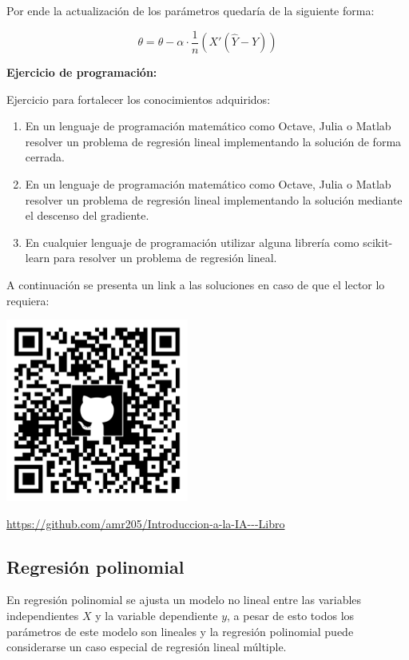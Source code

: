 \documentclass[11pt,fleqn]{book} %
\begin{document}
Por ende la actualización de los parámetros quedaría de la siguiente forma:

\begin{equation}
\label{eqn:linear_regression_gradient_descent}
\theta = \theta - \alpha \cdot \frac{1}{n} \left ( X' (\hat{Y}-Y ) \right )
\end{equation}

\textbf{Ejercicio de programación:}

Ejercicio para fortalecer los conocimientos adquiridos:

\begin{enumerate}
\item En un lenguaje de programación matemático como Octave, Julia o Matlab resolver un problema de regresión lineal implementando la solución de forma cerrada.
\item En un lenguaje de programación matemático como Octave, Julia o Matlab resolver un problema de regresión lineal implementando la solución mediante el descenso del gradiente.
\item En cualquier lenguaje de programación utilizar alguna librería como scikit-learn para resolver un problema de regresión lineal.
\end{enumerate}

A continuación se presenta un link a las soluciones en caso de que el lector lo requiera:

\includegraphics[width=6cm]{Pictures/github/libro-ia.png}

\url{https://github.com/amr205/Introduccion-a-la-IA---Libro}

\clearpage

\subsection{Regresión polinomial} 

En regresión polinomial se ajusta un modelo no lineal entre las variables independientes $X$ y la variable dependiente $y$, a pesar de esto todos los parámetros de este modelo son lineales y la regresión polinomial puede considerarse un caso especial de regresión lineal múltiple.
\end{document}
